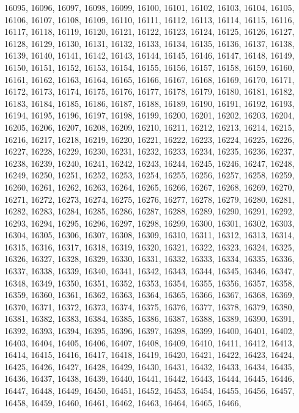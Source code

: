 16095,
16096,
16097,
16098,
16099,
16100,
16101,
16102,
16103,
16104,
16105,
16106,
16107,
16108,
16109,
16110,
16111,
16112,
16113,
16114,
16115,
16116,
16117,
16118,
16119,
16120,
16121,
16122,
16123,
16124,
16125,
16126,
16127,
16128,
16129,
16130,
16131,
16132,
16133,
16134,
16135,
16136,
16137,
16138,
16139,
16140,
16141,
16142,
16143,
16144,
16145,
16146,
16147,
16148,
16149,
16150,
16151,
16152,
16153,
16154,
16155,
16156,
16157,
16158,
16159,
16160,
16161,
16162,
16163,
16164,
16165,
16166,
16167,
16168,
16169,
16170,
16171,
16172,
16173,
16174,
16175,
16176,
16177,
16178,
16179,
16180,
16181,
16182,
16183,
16184,
16185,
16186,
16187,
16188,
16189,
16190,
16191,
16192,
16193,
16194,
16195,
16196,
16197,
16198,
16199,
16200,
16201,
16202,
16203,
16204,
16205,
16206,
16207,
16208,
16209,
16210,
16211,
16212,
16213,
16214,
16215,
16216,
16217,
16218,
16219,
16220,
16221,
16222,
16223,
16224,
16225,
16226,
16227,
16228,
16229,
16230,
16231,
16232,
16233,
16234,
16235,
16236,
16237,
16238,
16239,
16240,
16241,
16242,
16243,
16244,
16245,
16246,
16247,
16248,
16249,
16250,
16251,
16252,
16253,
16254,
16255,
16256,
16257,
16258,
16259,
16260,
16261,
16262,
16263,
16264,
16265,
16266,
16267,
16268,
16269,
16270,
16271,
16272,
16273,
16274,
16275,
16276,
16277,
16278,
16279,
16280,
16281,
16282,
16283,
16284,
16285,
16286,
16287,
16288,
16289,
16290,
16291,
16292,
16293,
16294,
16295,
16296,
16297,
16298,
16299,
16300,
16301,
16302,
16303,
16304,
16305,
16306,
16307,
16308,
16309,
16310,
16311,
16312,
16313,
16314,
16315,
16316,
16317,
16318,
16319,
16320,
16321,
16322,
16323,
16324,
16325,
16326,
16327,
16328,
16329,
16330,
16331,
16332,
16333,
16334,
16335,
16336,
16337,
16338,
16339,
16340,
16341,
16342,
16343,
16344,
16345,
16346,
16347,
16348,
16349,
16350,
16351,
16352,
16353,
16354,
16355,
16356,
16357,
16358,
16359,
16360,
16361,
16362,
16363,
16364,
16365,
16366,
16367,
16368,
16369,
16370,
16371,
16372,
16373,
16374,
16375,
16376,
16377,
16378,
16379,
16380,
16381,
16382,
16383,
16384,
16385,
16386,
16387,
16388,
16389,
16390,
16391,
16392,
16393,
16394,
16395,
16396,
16397,
16398,
16399,
16400,
16401,
16402,
16403,
16404,
16405,
16406,
16407,
16408,
16409,
16410,
16411,
16412,
16413,
16414,
16415,
16416,
16417,
16418,
16419,
16420,
16421,
16422,
16423,
16424,
16425,
16426,
16427,
16428,
16429,
16430,
16431,
16432,
16433,
16434,
16435,
16436,
16437,
16438,
16439,
16440,
16441,
16442,
16443,
16444,
16445,
16446,
16447,
16448,
16449,
16450,
16451,
16452,
16453,
16454,
16455,
16456,
16457,
16458,
16459,
16460,
16461,
16462,
16463,
16464,
16465,
16466,
